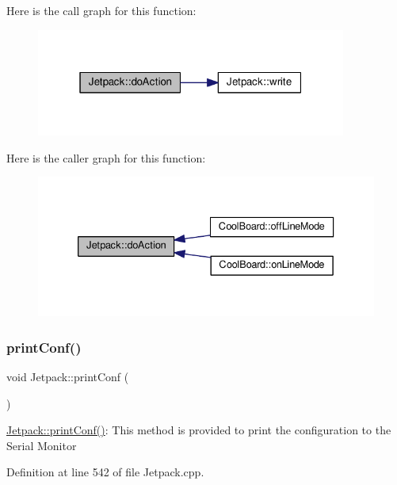 Here is the call graph for this function\+:\nopagebreak
\begin{figure}[H]
\begin{center}
\leavevmode
\includegraphics[width=289pt]{classJetpack_a9e703197093094b963f9ad57817495b8_cgraph}
\end{center}
\end{figure}
Here is the caller graph for this function\+:\nopagebreak
\begin{figure}[H]
\begin{center}
\leavevmode
\includegraphics[width=333pt]{classJetpack_a9e703197093094b963f9ad57817495b8_icgraph}
\end{center}
\end{figure}
\mbox{\label{classJetpack_ac54a7bb4f9166bee32052253d9b1d306}} 
\subsubsection{\texorpdfstring{print\+Conf()}{printConf()}}
{\footnotesize\ttfamily void Jetpack\+::print\+Conf (\begin{DoxyParamCaption}{ }\end{DoxyParamCaption})}

\hyperlink{classJetpack_ac54a7bb4f9166bee32052253d9b1d306}{Jetpack\+::print\+Conf()}\+: This method is provided to print the configuration to the Serial Monitor 

Definition at line 542 of file Jetpack.\+cpp.



